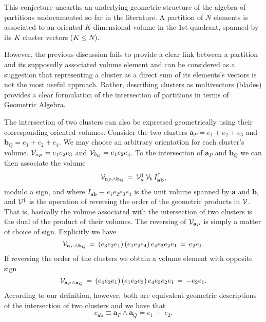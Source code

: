 \documentclass[twocolumn,aps,sort,nofootinbib]{revtex4}
\begin{document}
This conjecture unearths an underlying geometric structure of the
algebra of partitions undocumented so far in the literature. A partition 
of $N$ elements is associated to an oriented $K$-dimensional volume 
in the $1$st quadrant, spanned by its $K$ cluster vectors ($K\leq N$).

However, the previous discussion fails to provide a clear link between
a partition and its supposedly associated volume element and can be
considered as a suggestion that representing a cluster
as a direct sum of its elements's vectors is not the most useful approach.
Rather, describing clusters as multivectors (blades) provides a 
clear formulation of the intersection of partitions in terms of
Geometric Algebra.

The intersection of two clusters can also be expressed geometrically
using their corresponding oriented volumes. Consider the two clusters
$\mathbf{a}_P=e_1+e_2+e_3$ and $\mathbf{b}_Q=e_1+e_2+e_4$. We may choose
an arbitrary orientation for each cluster's volume. 
${\cal V}_{a_P}=e_1e_2e_3$ and ${\cal V}_{b_Q}=e_1e_2e_4$. 
To the intersection of $\mathbf{a}_P$ and $\mathbf{b}_Q$ we can then associate the 
volume
\begin{equation}
{\cal V}_{\mathbf{a}_P\wedge \mathbf{b}_Q}\,=\, {\cal V}_{a}^{\dag}\,{\cal V}_{b}\,
I_{\mathbf{a}\mathbf{b}}^{\dag},
\end{equation}
modulo a sign, and where $I_{\mathbf{a}\mathbf{b}}\equiv e_1e_2e_3e_4$ is the unit volume
spanned by $\mathbf{a}$ and $\mathbf{b}$, and ${\cal V}^\dag$ is the operation of reversing
the order of the geometric products in ${\cal V}$. That is, basically the volume associated with
the intersection of two clusters is the dual of the product of their volumes. The 
reversing of ${\cal V}_{\mathbf{a}_P}$ is simply a matter of choice of 
sign. Explicitly we have
\begin{equation}
{\cal V}_{\mathbf{a}_P\wedge \mathbf{b}_Q}\,=\, \left( e_3e_2e_1\right)\left( e_1e_2e_4\right)
e_4e_3e_2e_1\,=\,e_2e_1.
\end{equation}  
If reversing the order of the clusters we obtain a volume element with opposite sign
\begin{equation}
{\cal V}_{\mathbf{a}_P\wedge \mathbf{a}_Q}\,=\, \left( e_4e_2e_1\right)\left( e_1e_2e_3 \right)
e_4e_3e_2e_1\,=\,-e_2e_1.
\end{equation}  
According to our definition, however, both are equivalent geometric descriptions of
the intersection of two clusters and we have that 
\begin{equation}
c_{\mathbf{a}\mathbf{b}}\equiv \mathbf{a}_P\wedge \mathbf{a}_Q = e_1\,+\, e_2 .
\end{equation}
\end{document}
